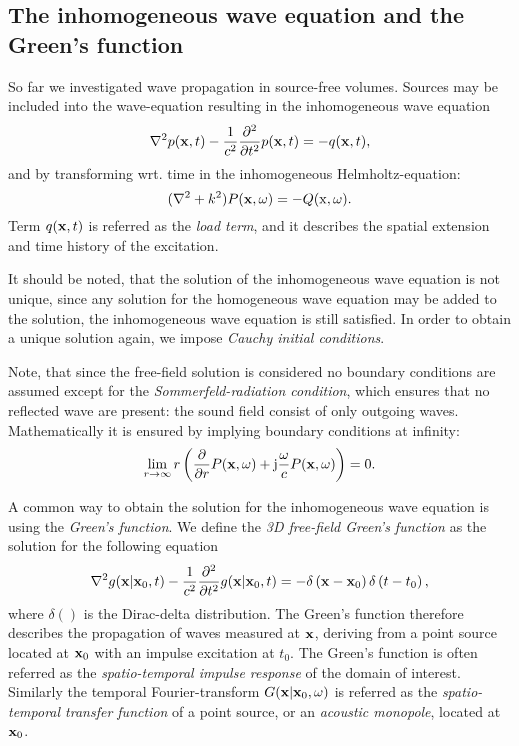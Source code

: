 \newpage
\subsection{The inhomogeneous wave equation and the Green's function}

So far we investigated wave propagation in source-free volumes. Sources may be included into the wave-equation resulting in the inhomogeneous wave equation
\begin{equation}
\nabla^2 p(\mathbf{x},t) -\frac{1}{c^2}\frac{\partial^2}{\partial t^2}p(\mathbf{x},t) = -q(\mathbf{x},t),
\label{Eq:Theory:Inhomogene_wave_eq_time_domain}
\end{equation}
and by transforming wrt. time in the inhomogeneous Helmholtz-equation:
\begin{equation}
(\nabla^2 + k^2 ) P(\mathbf{x},\omega ) = -Q(\mathrm{x},\omega).
\end{equation}
Term $q(\mathbf{x},t)$ is referred as the \emph{load term}, and it describes the spatial extension and time history of the excitation.

It should be noted, that the solution of the inhomogeneous wave equation is not unique, since any solution for the homogeneous wave equation may be added to the solution, the inhomogeneous wave equation is still satisfied. In order to obtain a unique solution again, we impose \emph{Cauchy initial conditions}.

Note, that since the free-field solution is considered no boundary conditions are assumed except for the \emph{Sommerfeld-radiation condition}, which ensures that no reflected wave are present: the sound field consist of only outgoing waves. Mathematically it is ensured by implying boundary conditions at infinity:
\begin{equation}
\lim_{r \rightarrow \infty} r \left( \frac{\partial}{\partial r}P(\mathbf{x},\omega) +\mathrm{j} \frac{\omega}{c}P(\mathbf{x},\omega) \right) = 0.
\label{Eq:Theory:Sommerfeld_radiation_condition}
\end{equation}

\vspace{3mm}
A common way to obtain the solution for the inhomogeneous wave equation is using the \emph{Green's function}. We define the \emph{3D free-field Green's function} as the solution for the following equation \cite{Gumerov2004, Williams1999}
\begin{equation}
\nabla^2 g(\mathbf{x}|\mathbf{x}_0,t) -\frac{1}{c^2}\frac{\partial^2}{\partial t^2} g(\mathbf{x}|\mathbf{x}_0,t) = -\delta\left( \mathbf{x} - \mathbf{x}_0 \right)\delta\left( t - t_0 \right),
\label{Eq:Theory:Green_function_def}
\end{equation}
where $\delta()$ is the Dirac-delta distribution. The Green's function therefore describes the propagation of waves measured at $\mathbf{x}$, deriving from a point source located at $\mathbf{x}_0$ with an impulse excitation at $t_0$. The Green's function is often referred as the \emph{spatio-temporal impulse response} of the domain of interest.
Similarly the temporal Fourier-transform $G(\mathbf{x}|\mathbf{x}_0,\omega)$ is referred as the \emph{spatio-temporal transfer function} of a point source, or an \emph{acoustic monopole}, located at $\mathbf{x}_0$. 

